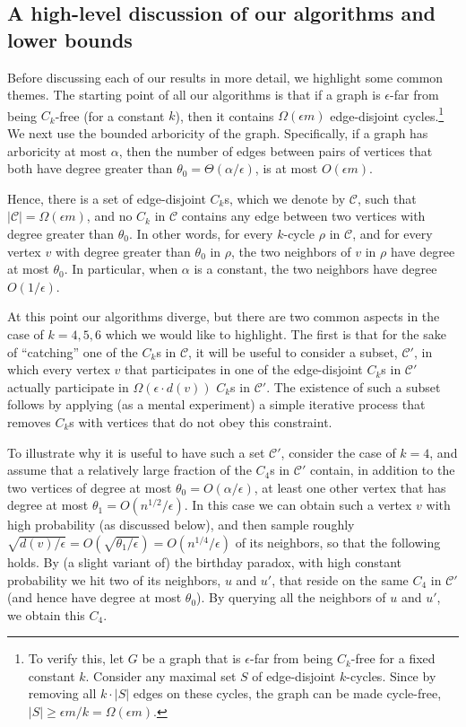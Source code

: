 \documentclass{article}
\newcommand{\eps}{\epsilon}
\newcommand{\calC}{{\mathcal{C}}}
\newcommand{\SodaReb}[1]{{ #1}}
\newcommand{\ICALPCR}[1]{{#1}}
\newcommand{\ForFuture}[1]{}
\begin{document}
\subsection{A high-level discussion of our algorithms and lower bounds}\label{subsec:high-level-intro}
\ForFuture{reconsider epsilon in this part}
Before discussing each of our results in more detail, we highlight some common themes. The starting point of all our algorithms is that if a graph is $\eps$-far from being $C_k$-free  (for a constant $k$), then it contains $\Omega(\eps m)$ edge-disjoint cycles.\footnote{\ICALPCR{To verify this, let $G$ be a graph that is $\epsilon$-far from being $C_k$-free for a fixed constant $k$. Consider any maximal set $S$ of edge-disjoint $k$-cycles. Since by removing all $k\cdot |S|$ edges on these cycles, the graph can be made cycle-free, $|S| \geq \epsilon m /k = \Omega(\epsilon m)$.}}
We next use the bounded arboricity of the graph. Specifically, if a graph has arboricity at most $\alpha$, then the number of edges between pairs of vertices that both have degree greater than $\theta_0 = \Theta(\alpha/\eps) $, is at most $O(\eps m)$. 

Hence, there is a set of edge-disjoint $C_k$s, which we denote by $\calC$, such that $|\calC| =\Omega(\eps m)$, and no $C_k$ in $\calC$ contains any edge between two vertices with degree greater than $\theta_0$. In other words, for every $k$-cycle $\rho$ in $\calC$, and for every vertex $v$ with degree greater than $\theta_0$ in $\rho$, the two neighbors of $v$ in $\rho$ have degree at most $\theta_0$.
In particular, when $\alpha$ is a constant, the two neighbors have degree $O(1/\eps)$.

At this point our algorithms diverge, but there are two common aspects in the case of $k=4,5,6$ which we would like to highlight. The first is that for the sake of ``catching'' one of the $C_k$s in $\calC$, it will be useful to  consider a subset, $\calC'$, in which every vertex $v$ that participates in one of the edge-disjoint $C_k$s in $\calC'$ actually participate in $\Omega(\eps\cdot d(v))$  $C_k$s in $\calC'$. The existence of such a subset follows by applying (as a mental experiment) a simple iterative process that removes $C_k$s with vertices that do not obey this constraint.

To illustrate why it is useful to have such a set $\calC'$, consider the case of $k=4$, and assume that a relatively large fraction of the $C_4$s in $\calC'$ contain, in addition to the two vertices of degree at most $\theta_0 = O(\alpha/\eps)$, at least one other vertex  that has degree at most $\theta_1=O(n^{1/2}/\eps)$. 
\SodaReb{
In this case we can obtain such a vertex $v$ with high probability (as discussed below), and then sample 
roughly $\sqrt{d(v)/\eps} = O(\sqrt{\theta_1/\eps})=O(n^{1/4}/\eps)$ of its neighbors, so that the following holds.}
By (a slight variant of) the birthday paradox, with high constant probability we hit two of its neighbors, $u$ and $u'$, that reside on the same $C_4$ in $\calC'$ (and hence have degree at most $\theta_0$). By querying all the neighbors of $u$ and $u'$, we obtain this $C_4$.
\end{document}
